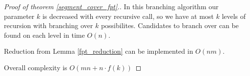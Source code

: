 \begin{proof}[Proof of theorem \ref{segment_cover_fpt}.]
In this branching algorithm our parameter $k$ is decreased with every
recursive call, so we have at most $k$ levels of recursion with
branching over $k$ possibilites. Candidates to branch over
can be found on each level in time $O(n)$.

Reduction from Lemma \ref{fpt_reduction} can be implemented in $O(nm)$.

Overall complexity is $O(mn + n \cdot f(k))$

\end{proof}

